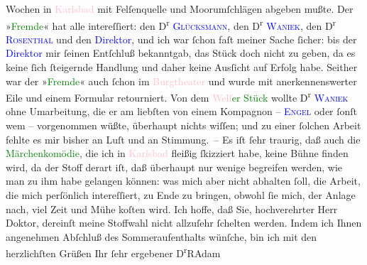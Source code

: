                    Wochen in \textcolor{pink}{Karlsbad}{}\ledrightnote{\textcolor{pink}{Karlsbad}} mit Felſenquelle und
                    Moorumſchlägen abgeben mußte. Der »\textcolor{green}{Fremde}{}\ledrightnote{\textcolor{green}{Der Fremde}}« hat
                    alle intereſſiert: den D\textsuperscript{r}{ }\textcolor{blue}{\textsc{Glücksmann}}{}\ledrightnote{\textcolor{blue}{Heinrich Glücksmann}}, {\pb}den D\textsuperscript{r}{ }\textcolor{blue}{\textsc{Waniek}}{}\ledrightnote{\textcolor{blue}{Wolfgang Waniek}}, den D\textsuperscript{r}{ }\textcolor{blue}{\textsc{Rosenthal}}{}\ledrightnote{\textcolor{blue}{Friedrich Rosenthal}} und den \textcolor{blue}{Direktor}{}, und
                    ich war ſchon faſt meiner Sache ſicher: bis der \textcolor{blue}{Direktor}{} mir ſeinen Entſchluß bekanntgab, das Stück
                    doch nicht zu geben, da es keine ſich ſteigernde Handlung und daher keine
                    Ausſicht auf Erfolg habe. Seither war der »\textcolor{green}{Fremde}{}\ledrightnote{\textcolor{green}{Der Fremde}}« auch ſchon im \textcolor{pink}{Burgtheater}{}\ledrightnote{\textcolor{pink}{Burgtheater}} und
                    wurde mit anerkennenswerter Eile und einem Formular retourniert. Von dem \textcolor{green}{\textcolor{pink}{Welſ}{}\ledrightnote{\textcolor{pink}{Wels}}er Stück}{} wollte D\textsuperscript{r}{ }\textcolor{blue}{\textsc{Waniek}}{}\ledrightnote{\textcolor{blue}{Wolfgang Waniek}} ohne Umarbeitung, die er am liebſten von einem Kompagnon – \textcolor{blue}{\textsc{Engel}}{}\ledrightnote{\textcolor{blue}{Alexander Engel}}{ } oder ſonſt wem – vorgenommen wüßte, überhaupt nichts wiſſen; und zu einer
                    ſolchen Arbeit fehlte es mir bisher an Luſt und an Stimmung. –\pend
           \pstart
           Es iſt ſehr traurig, daß auch die \textcolor{green}{Märchenkomödie}{}\ledrightnote{\textcolor{green}{Märchenkomödie}}, die ich in \textcolor{pink}{Karlsbad}{}\ledrightnote{\textcolor{pink}{Karlsbad}}
                    fleißig ſkizziert habe, keine Bühne finden wird, da der Stoff derart iſt, daß
                    überhaupt nur wenige begreifen werden, wie man zu ihm habe gelangen können: was
                    mich aber nicht abhalten ſoll, die Arbeit, die mich perſönlich intereſſiert, {\pb}zu Ende zu bringen, obwohl ſie mich,
                    der Anlage nach, viel Zeit und Mühe koſten wird. Ich hoffe, daß Sie,
                    hochverehrter Herr Doktor, dereinſt meine Stoffwahl nicht allzuſehr ſchelten
                    werden.\pend
           \pstart
           Indem ich Ihnen angenehmen Abſchluß des Sommeraufenthalts wünſche, bin ich mit
                    den herzlichſten Grüßen Ihr ſehr ergebener\pend
           \pstart \spacefill\mbox{D\textsuperscript{r}RAdam}\pend{}\endnumbering{}  
      